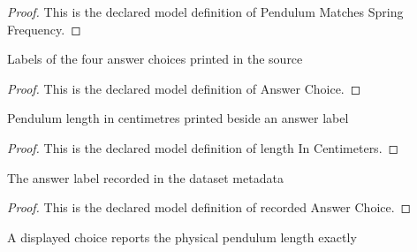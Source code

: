 \begin{proof}
  This is the declared model definition of Pendulum Matches Spring Frequency.
\end{proof}
\begin{definition}
  \label{def:physics:phyx-mini-0281:phyxminiproblems-problemphyxmini0281-answerchoice}
  Labels of the four answer choices printed in the source
\end{definition}
\begin{proof}
  This is the declared model definition of Answer Choice.
\end{proof}
\begin{definition}
  \label{def:physics:phyx-mini-0281:phyxminiproblems-problemphyxmini0281-answerchoice-lengthincentimeters}
  Pendulum length in centimetres printed beside an answer label
\end{definition}
\begin{proof}
  This is the declared model definition of length In Centimeters.
\end{proof}
\begin{definition}
  \label{def:physics:phyx-mini-0281:phyxminiproblems-problemphyxmini0281-recordedanswerchoice}
  The answer label recorded in the dataset metadata
\end{definition}
\begin{proof}
  This is the declared model definition of recorded Answer Choice.
\end{proof}
\begin{definition}
  \label{def:physics:phyx-mini-0281:phyxminiproblems-problemphyxmini0281-matchesanswerchoice}
  A displayed choice reports the physical pendulum length exactly
\end{definition}
